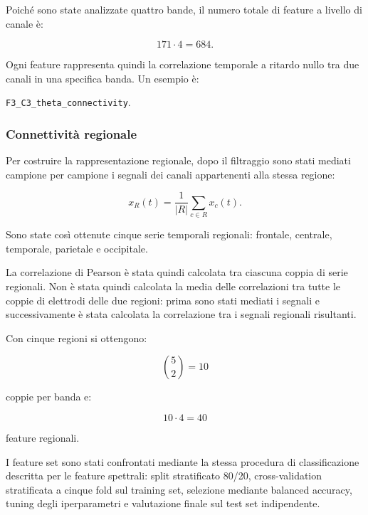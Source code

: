 Poiché sono state analizzate quattro bande, il numero totale di
feature a livello di canale è:

\begin{equation}
	171\cdot4
	=
	684.
\end{equation}

Ogni feature rappresenta quindi la correlazione temporale a ritardo
nullo tra due canali in una specifica banda. Un esempio è:

\begin{center}
	\texttt{F3\_C3\_theta\_connectivity}.
\end{center}


\subsubsection{Connettività regionale}

Per costruire la rappresentazione regionale, dopo il filtraggio sono
stati mediati campione per campione i segnali dei canali appartenenti
alla stessa regione:

\begin{equation}
	x_R(t)
	=
	\frac{1}{|R|}
	\sum_{c\in R}
	x_c(t).
\end{equation}

Sono state così ottenute cinque serie temporali regionali: frontale,
centrale, temporale, parietale e occipitale.

La correlazione di Pearson è stata quindi calcolata tra ciascuna
coppia di serie regionali. Non è stata quindi calcolata la media delle
correlazioni tra tutte le coppie di elettrodi delle due regioni:
prima sono stati mediati i segnali e successivamente è stata calcolata
la correlazione tra i segnali regionali risultanti.

Con cinque regioni si ottengono:

\begin{equation}
	\binom{5}{2}
	=
	10
\end{equation}

coppie per banda e:

\begin{equation}
	10\cdot4
	=
	40
\end{equation}

feature regionali.


I  feature set sono stati confrontati mediante la stessa procedura
di classificazione descritta per le feature spettrali: split
stratificato 80/20, cross-validation stratificata a cinque fold sul
training set, selezione mediante balanced accuracy, tuning degli
iperparametri e valutazione finale sul test set indipendente.